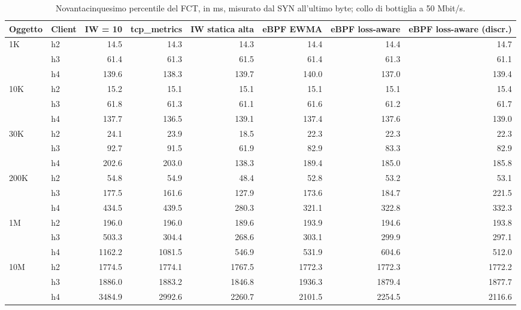 \begin{table}[htbp]
  \centering
  \caption{Novantacinquesimo percentile del FCT, in ms, misurato dal SYN all'ultimo byte; collo di bottiglia a 50 Mbit/s.}
  \label{tab:fct-p95-50}
  \begin{tabular}{llrrrrrr}
    \toprule
    Oggetto & Client & IW = 10 & tcp\_metrics & IW statica alta & eBPF EWMA & eBPF loss-aware & eBPF loss-aware (discr.) \\
    \midrule
    1K & h2 & 14.5 & 14.3 & 14.3 & 14.4 & 14.4 & 14.7 \\
     & h3 & 61.4 & 61.3 & 61.5 & 61.4 & 61.3 & 61.1 \\
     & h4 & 139.6 & 138.3 & 139.7 & 140.0 & 137.0 & 139.4 \\
    \addlinespace
    10K & h2 & 15.2 & 15.1 & 15.1 & 15.1 & 15.1 & 15.4 \\
     & h3 & 61.8 & 61.3 & 61.1 & 61.6 & 61.2 & 61.7 \\
     & h4 & 137.7 & 136.5 & 139.1 & 137.4 & 137.6 & 139.0 \\
    \addlinespace
    30K & h2 & 24.1 & 23.9 & 18.5 & 22.3 & 22.3 & 22.3 \\
     & h3 & 92.7 & 91.5 & 61.9 & 82.9 & 83.3 & 82.9 \\
     & h4 & 202.6 & 203.0 & 138.3 & 189.4 & 185.0 & 185.8 \\
    \addlinespace
    200K & h2 & 54.8 & 54.9 & 48.4 & 52.8 & 53.2 & 53.1 \\
     & h3 & 177.5 & 161.6 & 127.9 & 173.6 & 184.7 & 221.5 \\
     & h4 & 434.5 & 439.5 & 280.3 & 321.1 & 322.8 & 332.3 \\
    \addlinespace
    1M & h2 & 196.0 & 196.0 & 189.6 & 193.9 & 194.6 & 193.8 \\
     & h3 & 503.3 & 304.4 & 268.6 & 303.1 & 299.9 & 297.1 \\
     & h4 & 1162.2 & 1081.5 & 546.9 & 531.9 & 604.6 & 512.0 \\
    \addlinespace
    10M & h2 & 1774.5 & 1774.1 & 1767.5 & 1772.3 & 1772.3 & 1772.2 \\
     & h3 & 1886.0 & 1883.2 & 1846.8 & 1936.3 & 1879.4 & 1877.7 \\
     & h4 & 3484.9 & 2992.6 & 2260.7 & 2101.5 & 2254.5 & 2116.6 \\
    \bottomrule
  \end{tabular}
\end{table}
